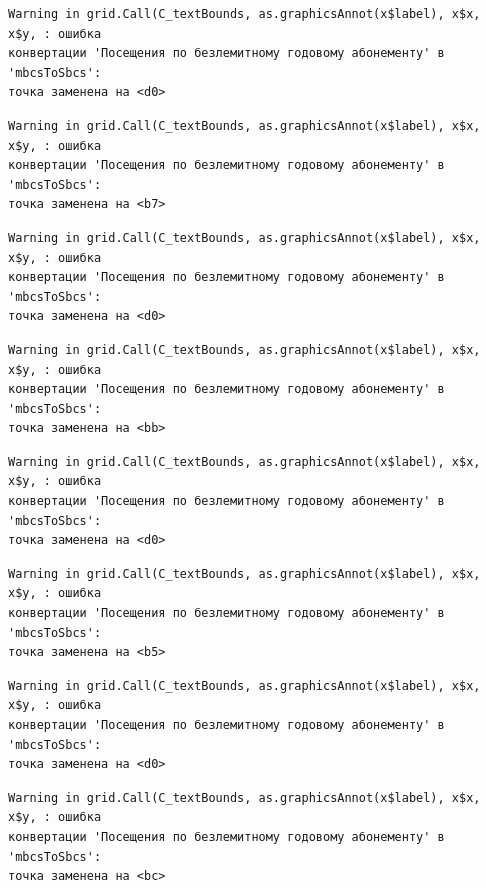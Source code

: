 \documentclass[
  letterpaper,
  DIV=11,
  numbers=noendperiod]{scrreprt}
\begin{document}
\begin{verbatim}
Warning in grid.Call(C_textBounds, as.graphicsAnnot(x$label), x$x, x$y, : ошибка
конвертации 'Посещения по безлемитному годовому абонементу' в 'mbcsToSbcs':
точка заменена на <d0>
\end{verbatim}

\begin{verbatim}
Warning in grid.Call(C_textBounds, as.graphicsAnnot(x$label), x$x, x$y, : ошибка
конвертации 'Посещения по безлемитному годовому абонементу' в 'mbcsToSbcs':
точка заменена на <b7>
\end{verbatim}

\begin{verbatim}
Warning in grid.Call(C_textBounds, as.graphicsAnnot(x$label), x$x, x$y, : ошибка
конвертации 'Посещения по безлемитному годовому абонементу' в 'mbcsToSbcs':
точка заменена на <d0>
\end{verbatim}

\begin{verbatim}
Warning in grid.Call(C_textBounds, as.graphicsAnnot(x$label), x$x, x$y, : ошибка
конвертации 'Посещения по безлемитному годовому абонементу' в 'mbcsToSbcs':
точка заменена на <bb>
\end{verbatim}

\begin{verbatim}
Warning in grid.Call(C_textBounds, as.graphicsAnnot(x$label), x$x, x$y, : ошибка
конвертации 'Посещения по безлемитному годовому абонементу' в 'mbcsToSbcs':
точка заменена на <d0>
\end{verbatim}

\begin{verbatim}
Warning in grid.Call(C_textBounds, as.graphicsAnnot(x$label), x$x, x$y, : ошибка
конвертации 'Посещения по безлемитному годовому абонементу' в 'mbcsToSbcs':
точка заменена на <b5>
\end{verbatim}

\begin{verbatim}
Warning in grid.Call(C_textBounds, as.graphicsAnnot(x$label), x$x, x$y, : ошибка
конвертации 'Посещения по безлемитному годовому абонементу' в 'mbcsToSbcs':
точка заменена на <d0>
\end{verbatim}

\begin{verbatim}
Warning in grid.Call(C_textBounds, as.graphicsAnnot(x$label), x$x, x$y, : ошибка
конвертации 'Посещения по безлемитному годовому абонементу' в 'mbcsToSbcs':
точка заменена на <bc>
\end{verbatim}
\end{document}
